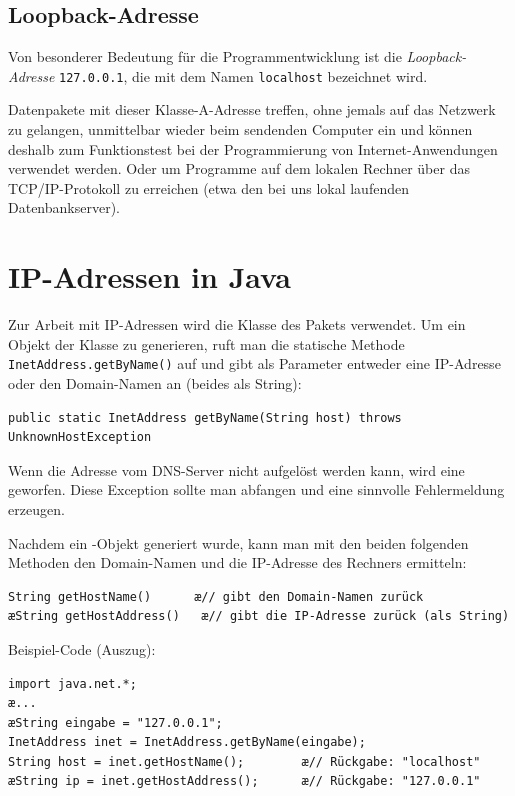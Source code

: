 \subsection{Loopback-Adresse}

Von besonderer Bedeutung für die Programmentwicklung ist die
\emph{Loopback-Adresse} \lstinline|127.0.0.1|, die mit dem Namen
\lstinline|localhost| bezeichnet wird.

Datenpakete mit dieser Klasse-A-Adresse treffen, ohne jemals auf das Netzwerk
zu gelangen, unmittelbar wieder beim sendenden Computer ein und können deshalb
zum Funktionstest bei der Programmierung von Internet-Anwendungen verwendet
werden. Oder um Programme auf dem lokalen Rechner über das TCP/IP-Protokoll zu
erreichen (etwa den bei uns lokal laufenden Datenbankserver).


\section{IP-Adressen in Java}

Zur Arbeit mit IP-Adressen wird die Klasse  des Pakets
 verwendet. Um ein Objekt der Klasse 
zu generieren, ruft man die statische Methode
\lstinline|InetAddress.getByName()| auf und gibt als Parameter entweder eine
IP-Adresse oder den Domain-Namen an (beides als String):

\begin{lstlisting}
public static InetAddress getByName(String host) throws UnknownHostException
\end{lstlisting}

Wenn die Adresse vom DNS-Server nicht aufgelöst werden kann, wird eine
 geworfen. Diese Exception sollte man abfangen und
eine sinnvolle Fehlermeldung erzeugen.

Nachdem ein -Objekt generiert wurde, kann man mit den beiden
folgenden Methoden den Domain-Namen und die IP-Adresse des Rechners ermitteln:

\begin{lstlisting}
String getHostName()      æ// gibt den Domain-Namen zurück
æString getHostAddress()   æ// gibt die IP-Adresse zurück (als String)
\end{lstlisting}

Beispiel-Code (Auszug):

\begin{lstlisting}
import java.net.*;
æ...
æString eingabe = "127.0.0.1";
InetAddress inet = InetAddress.getByName(eingabe);
String host = inet.getHostName();        æ// Rückgabe: "localhost"
æString ip = inet.getHostAddress();	     æ// Rückgabe: "127.0.0.1"
\end{lstlisting}
		

